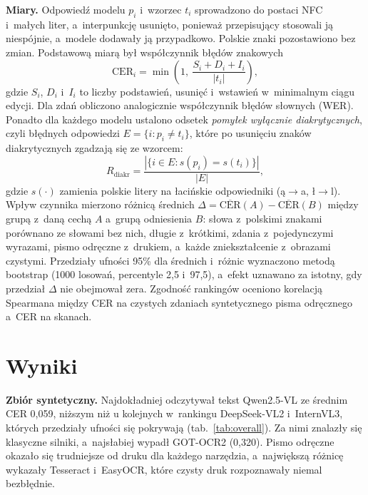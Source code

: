 \documentclass[runningheads,orivec]{llncs}
\begin{document}
\textbf{Miary.} Odpowiedź modelu $p_i$ i~wzorzec $t_i$ sprowadzono do postaci NFC i~małych liter, a~interpunkcję
usunięto, ponieważ przepisujący stosowali ją niespójnie, a~modele dodawały ją przypadkowo. Polskie znaki
pozostawiono bez zmian. Podstawową miarą był współczynnik błędów znakowych
\begin{equation}\label{eq:cer}
  \mathrm{CER}_i = \min\left(1,\ \frac{S_i + D_i + I_i}{|t_i|}\right),
\end{equation}
gdzie $S_i$, $D_i$ i~$I_i$ to liczby podstawień, usunięć i~wstawień w~minimalnym ciągu edycji. Dla zdań
obliczono analogicznie współczynnik błędów słownych (WER). Ponadto dla każdego modelu ustalono
odsetek \emph{pomyłek wyłącznie diakrytycznych}, czyli błędnych odpowiedzi $E=\{i: p_i\neq t_i\}$,
które po usunięciu znaków diakrytycznych zgadzają się ze wzorcem:
\begin{equation}\label{eq:diacr}
  R_{\mathrm{diakr}} = \frac{|\{i\in E: s(p_i) = s(t_i)\}|}{|E|},
\end{equation}
gdzie $s(\cdot)$ zamienia polskie litery na łacińskie odpowiedniki (ą$\to$a, ł$\to$l). Wpływ czynnika
mierzono różnicą średnich $\Delta=\overline{\mathrm{CER}}(A)-\overline{\mathrm{CER}}(B)$ między grupą z~daną
cechą $A$ a~grupą odniesienia $B$: słowa z~polskimi znakami porównano ze słowami bez nich, długie z~krótkimi,
zdania z~pojedynczymi wyrazami, pismo odręczne z~drukiem, a~każde zniekształcenie z~obrazami czystymi. Przedziały ufności 95\% dla średnich i~różnic
wyznaczono metodą bootstrap (1000 losowań, percentyle 2,5 i~97,5), a~efekt uznawano za istotny, gdy przedział
$\Delta$ nie obejmował zera. Zgodność rankingów oceniono korelacją Spearmana między CER na czystych zdaniach
syntetycznego pisma odręcznego a~CER na skanach.

\section{Wyniki}

\textbf{Zbiór syntetyczny.} Najdokładniej odczytywał tekst \mbox{Qwen2.5-VL} ze średnim CER 0,059, niższym niż u kolejnych w~rankingu \mbox{DeepSeek-VL2} i~InternVL3, których przedziały ufności się pokrywają
(tab.~\ref{tab:overall}). Za nimi znalazły się klasyczne silniki, a~najsłabiej wypadł \mbox{GOT-OCR2} (0,320).
Pismo odręczne okazało się trudniejsze od druku dla każdego narzędzia, a~największą różnicę wykazały
Tesseract i~EasyOCR, które czysty druk rozpoznawały niemal bezbłędnie.
\end{document}
